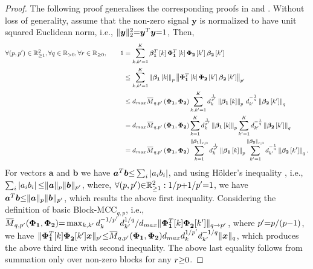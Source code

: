 \begin{proof}
The following proof generalises the corresponding proofs in \cite{Elad2001,Elad2002a,Eldar2009b,Eldar2010b} and \cite{Eldar2010}.
Without loss of generality, assume that the non-zero signal $\boldsymbol{y}$ is normalized to have unit squared Euclidean norm, i.e., $\Vert\boldsymbol{y}\Vert_2^2 {=} \boldsymbol{y}^T \boldsymbol{y} {=} 1$, 
Then,
\begin{equation}
\label{eq:DontKnow3} 
\begin{aligned}
\forall (p , p') \in \mathbb{R}^2_{\geq 1}, \forall q \in \mathbb{R}_{> 0}, \forall r \in \mathbb{R}_{\geq 0}, \qquad
1 &= \displaystyle\sum_{k,k'=1}^K \mybetao^T \mybracket{k} \myPhiOne^T\mybracket{k} \myPhiTwo \mybracket{k'} \mybetaTwo \mybracket{k'} \\
&\leq \displaystyle\sum_{k,k'=1}^K \mynorm{\mybetao \mybracket{k}}_p \mynorm{\myPhiOne^T \mybracket{k} \myPhiTwo \mybracket{k'} \mybetaTwo \mybracket{k'}}_{p'} \\
&\leq d_{max} \overbar{M}_{q,p'}\myparanthese{\myPhiOne, \myPhiTwo} \displaystyle\sum_{k,k'=1}^K d_k^{\frac{1}{p'}} \mynorm{\mybetao \mybracket{k}}_p \, d_{k'}^{-\frac{1}{q}}\mynorm{\mybetaTwo \mybracket{k'}}_q \\
&= d_{max} \overbar{M}_{q,p'}\myparanthese{\myPhiOne , \myPhiTwo} \displaystyle\sum_{k=1}^K d_k^{\frac{1}{p'}} \mynorm{\mybetao \mybracket{k}}_p \displaystyle\sum_{k'=1}^K d_{k'}^{-\frac{1}{q}}\mynorm{\mybetaTwo \mybracket{k'}}_q \\
&= d_{max} \overbar{M}_{q,p'}\myparanthese{\myPhiOne , \myPhiTwo} \displaystyle\sum_{k=1}^{\mynorm{\mybetao}_{r,0}} d_k^{\frac{1}{p'}} \mynorm{\mybetao \mybracket{k}}_p \displaystyle\sum_{k'=1}^{\mynorm{\mybetaTwo}_{r,0}} d_{k'}^{-\frac{1}{q}} \mynorm{\mybetaTwo \mybracket{k'}}_q.
\end{aligned}
\end{equation}
For vectors $\boldsymbol{a}$ and $\boldsymbol{b}$ we have $\boldsymbol{a}^T \boldsymbol{b} {\leq} \sum_i \vert a_i b_i \vert$, and using H{\"o}lder's inequality \cite{Golub2013}, i.e., $\sum_i \left\lvert a_i b_i\right\rvert {\leq} \Vert \boldsymbol{a} \Vert_p \Vert \boldsymbol{b} \Vert_{p'}$, where, $\forall (p , p') {\in} \mathbb{R}^2_{{\geq} 1} : 1/p {+} 1/p' {=} 1$, we have $\boldsymbol{a}^T \boldsymbol{b} {\leq} \Vert\boldsymbol{a} \Vert_p \Vert \boldsymbol{b} \Vert_{p'}$, which results the above first inequality.
Considering the definition of basic Block-MCC$_{q,p}$, i.e., $\overbar{M}_{q,p'}(\myPhiOne , \myPhiTwo) \seq  
\max_{k,k'} d_{k}^{-1/{p'}} \, d_{k'}^{1/q}/d_{max} \Vert \myPhiOne^T [k] \myPhiTwo^{ } [k'] \Vert_{q \to p'}$, where $p' {=} p / (p {-} 1)$, we have $\Vert \myPhiOne^T [k] \myPhiTwo^{ } [k'] \boldsymbol{x} \Vert_{p'} \sleq \overbar{M}_{q,p'} (\myPhiOne, \myPhiTwo) d_{max} d_k^{1/p'} d_{k'}^{-1/q} \Vert \boldsymbol{x} \Vert_q$, which produces the above third line with second inequality.
The above last equality follows from summation only over non-zero blocks for any $r {\geq} 0$.


\end{proof}
